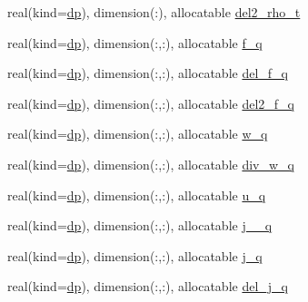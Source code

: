 \begin{DoxyCompactItemize}
\item 
real(kind=\mbox{\hyperlink{namespaceparameters_a52f8c6351fd79345d8811e065bcbbb37}{dp}}), dimension(\+:), allocatable \mbox{\hyperlink{group__DENSITIES_ga419642d914eb5865bb3537f5a4df7d34}{del2\+\_\+rho\+\_\+t}}
\item 
real(kind=\mbox{\hyperlink{namespaceparameters_a52f8c6351fd79345d8811e065bcbbb37}{dp}}), dimension(\+:,\+:), allocatable \mbox{\hyperlink{group__EFF__MASSES_ga5d14e09efe44edd96be9317868828e75}{f\+\_\+q}}
\item 
real(kind=\mbox{\hyperlink{namespaceparameters_a52f8c6351fd79345d8811e065bcbbb37}{dp}}), dimension(\+:,\+:), allocatable \mbox{\hyperlink{group__EFF__MASSES_gadd7fc7f6fdfb5f9f6303c42bfb0eb81c}{del\+\_\+f\+\_\+q}}
\item 
real(kind=\mbox{\hyperlink{namespaceparameters_a52f8c6351fd79345d8811e065bcbbb37}{dp}}), dimension(\+:,\+:), allocatable \mbox{\hyperlink{group__EFF__MASSES_ga0bdacded69f98c713231b1eeaa1a2d05}{del2\+\_\+f\+\_\+q}}
\item 
real(kind=\mbox{\hyperlink{namespaceparameters_a52f8c6351fd79345d8811e065bcbbb37}{dp}}), dimension(\+:,\+:), allocatable \mbox{\hyperlink{group__OTHER__DENSITIES_ga59950b9367b0a0afc462c00ef2eee424}{w\+\_\+q}}
\item 
real(kind=\mbox{\hyperlink{namespaceparameters_a52f8c6351fd79345d8811e065bcbbb37}{dp}}), dimension(\+:,\+:), allocatable \mbox{\hyperlink{group__OTHER__DENSITIES_ga20b386857a74ab08ec424aa7d6524f8b}{div\+\_\+w\+\_\+q}}
\item 
real(kind=\mbox{\hyperlink{namespaceparameters_a52f8c6351fd79345d8811e065bcbbb37}{dp}}), dimension(\+:,\+:), allocatable \mbox{\hyperlink{group__OTHER__DENSITIES_gae3217b84aeb9cb26575532fa2c7990cf}{u\+\_\+q}}
\item 
real(kind=\mbox{\hyperlink{namespaceparameters_a52f8c6351fd79345d8811e065bcbbb37}{dp}}), dimension(\+:,\+:), allocatable \mbox{\hyperlink{group__OTHER__DENSITIES_ga387eae15dcba990096da0b0a974f9858}{j\+\_\+\_\+q}}
\item 
real(kind=\mbox{\hyperlink{namespaceparameters_a52f8c6351fd79345d8811e065bcbbb37}{dp}}), dimension(\+:,\+:), allocatable \mbox{\hyperlink{group__OTHER__DENSITIES_gad0e3f674777d52020dcc69ec065a4710}{j\+\_\+q}}
\item 
real(kind=\mbox{\hyperlink{namespaceparameters_a52f8c6351fd79345d8811e065bcbbb37}{dp}}), dimension(\+:,\+:), allocatable \mbox{\hyperlink{group__OTHER__DENSITIES_gaa93ef4a0286129df654277cffb40933b}{del\+\_\+j\+\_\+q}}
\item 

\end{DoxyCompactItemize}
